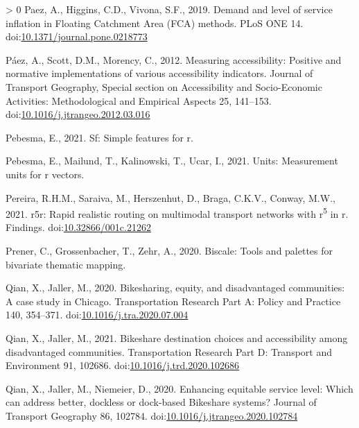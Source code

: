 \documentclass[]{elsarticle} %
\newlength{\cslhangindent}
\newenvironment{CSLReferences}[3] %
 {%
  \setlength{\parindent}{0pt}
  \ifodd #1 \everypar{\setlength{\hangindent}{\cslhangindent}}\ignorespaces\fi
  \ifnum #2 > 0
  \setlength{\parskip}{#2\baselineskip}
  \fi
 }%
 {}
\begin{document}
\begin{CSLReferences}{1}{0}
\leavevmode\hypertarget{ref-paezDemandLevelService2019}{}%
Paez, A., Higgins, C.D., Vivona, S.F., 2019. Demand and level of service
inflation in {Floating Catchment Area} ({FCA}) methods. PLoS ONE 14.
doi:\href{https://doi.org/10.1371/journal.pone.0218773}{10.1371/journal.pone.0218773}

\leavevmode\hypertarget{ref-paezMeasuringAccessibilityPositive2012}{}%
Páez, A., Scott, D.M., Morency, C., 2012. Measuring accessibility:
Positive and normative implementations of various accessibility
indicators. Journal of Transport Geography, Special {section} on
{Accessibility} and {Socio}-{Economic Activities}: {Methodological} and
{Empirical Aspects} 25, 141--153.
doi:\href{https://doi.org/10.1016/j.jtrangeo.2012.03.016}{10.1016/j.jtrangeo.2012.03.016}

\leavevmode\hypertarget{ref-R-sf}{}%
Pebesma, E., 2021. Sf: Simple features for r.

\leavevmode\hypertarget{ref-R-units}{}%
Pebesma, E., Mailund, T., Kalinowski, T., Ucar, I., 2021. Units:
Measurement units for r vectors.

\leavevmode\hypertarget{ref-Pereira2021r5r}{}%
Pereira, R.H.M., Saraiva, M., Herszenhut, D., Braga, C.K.V., Conway,
M.W., 2021. r5r: Rapid realistic routing on multimodal transport
networks with r\textsuperscript{5} in r. Findings.
doi:\href{https://doi.org/10.32866/001c.21262}{10.32866/001c.21262}

\leavevmode\hypertarget{ref-R-biscale}{}%
Prener, C., Grossenbacher, T., Zehr, A., 2020. Biscale: Tools and
palettes for bivariate thematic mapping.

\leavevmode\hypertarget{ref-qianBikesharingEquityDisadvantaged2020}{}%
Qian, X., Jaller, M., 2020. Bikesharing, equity, and disadvantaged
communities: {A} case study in {Chicago}. Transportation Research Part
A: Policy and Practice 140, 354--371.
doi:\href{https://doi.org/10.1016/j.tra.2020.07.004}{10.1016/j.tra.2020.07.004}

\leavevmode\hypertarget{ref-qianBikeshareDestinationChoices2021}{}%
Qian, X., Jaller, M., 2021. Bikeshare destination choices and
accessibility among disadvantaged communities. Transportation Research
Part D: Transport and Environment 91, 102686.
doi:\href{https://doi.org/10.1016/j.trd.2020.102686}{10.1016/j.trd.2020.102686}

\leavevmode\hypertarget{ref-qianEnhancingEquitableService2020}{}%
Qian, X., Jaller, M., Niemeier, D., 2020. Enhancing equitable service
level: {Which} can address better, dockless or dock-based {Bikeshare}
systems? Journal of Transport Geography 86, 102784.
doi:\href{https://doi.org/10.1016/j.jtrangeo.2020.102784}{10.1016/j.jtrangeo.2020.102784}


\end{CSLReferences}
\end{document}
